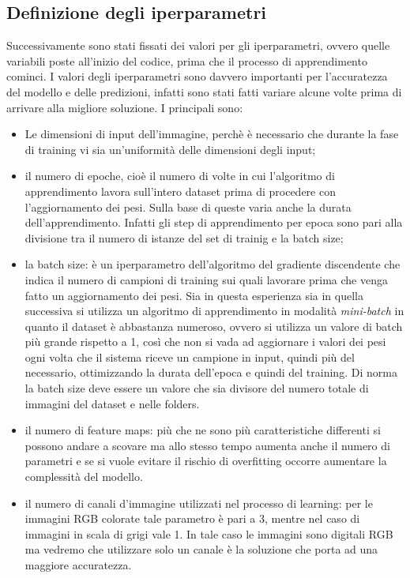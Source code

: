 \subsection{Definizione degli iperparametri}
Successivamente sono stati fissati dei valori per gli iperparametri, ovvero quelle variabili poste all'inizio del codice, prima che il processo di apprendimento cominci. I valori degli iperparametri sono davvero importanti per l’accuratezza del modello e delle predizioni, infatti sono stati fatti variare alcune volte prima di arrivare alla migliore soluzione. I principali sono: 
\begin{itemize}
\item Le dimensioni di input dell’immagine, perchè è necessario che durante la fase di training vi sia un'uniformità delle dimensioni degli input;
\item il numero di epoche, cioè il numero di volte in cui l’algoritmo di apprendimento lavora sull’intero dataset prima di procedere con l’aggiornamento dei pesi. Sulla base di queste varia anche la durata dell’apprendimento. Infatti gli step di apprendimento per epoca sono pari alla divisione tra il numero di istanze del set di trainig e la batch size;
\item la batch size: è un iperparametro dell’algoritmo del gradiente discendente che indica il numero di campioni di training sui quali lavorare prima che venga fatto un aggiornamento dei pesi. Sia in questa esperienza sia in quella successiva si utilizza un algoritmo di apprendimento in modalità \emph{mini-batch} in quanto il dataset è abbastanza numeroso, ovvero si utilizza un valore di batch più grande rispetto a 1, così che non si vada ad aggiornare i valori dei pesi ogni volta che il sistema riceve un campione in input, quindi più del necessario, ottimizzando la durata dell'epoca e quindi del training. Di norma la batch size deve essere un valore che sia divisore del numero totale di immagini del dataset e nelle folders. 
\item il numero di feature maps: più che ne sono più caratteristiche differenti si possono andare a scovare ma allo stesso tempo aumenta anche il numero di parametri e se si vuole evitare il rischio di overfitting occorre aumentare la complessità del modello.
\item il numero di canali d'immagine utilizzati nel processo di learning: per le immagini RGB colorate tale parametro è pari a 3, mentre nel caso di immagini in scala di grigi vale 1. In tale caso le immagini sono digitali RGB ma vedremo che utilizzare solo un canale è la soluzione che porta ad una maggiore accuratezza.
\end{itemize}

